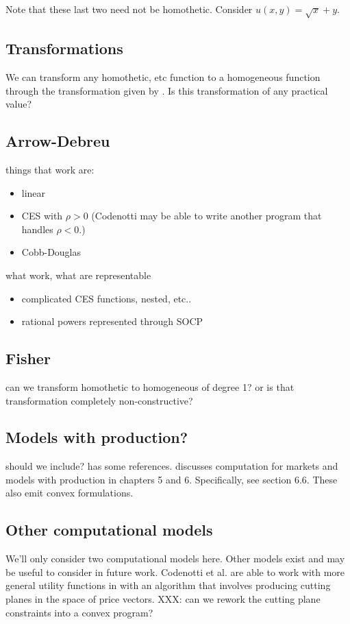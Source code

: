 \documentclass{article}
\begin{document}
Note that these last two need not be homothetic. Consider $u(x,y) = \sqrt{x} + y$.

\subsection{Transformations}
We can transform any homothetic, etc function to a homogeneous function
through the transformation given by \cite{jain2005market}.
Is this transformation of any practical value?


\subsection{Arrow-Debreu}
things that work are:
\begin{itemize}
\item linear
\item CES with $\rho > 0$ (Codenotti may be able to write another program that handles $\rho < 0$.)
\item Cobb-Douglas
\end{itemize}
what work, what are representable
\begin{itemize}
\item complicated CES functions, nested, etc..
\item rational powers represented through SOCP
\end{itemize}
\subsection{Fisher}
can we transform homothetic to homogeneous of degree 1? or is that transformation completely non-constructive?

\subsection{Models with production?}
should we include? \cite{jain2005market} has some references.
\cite{nisan2007algorithmic} discusses computation for markets and models with production in chapters 5 and 6. Specifically, see section 6.6. These also emit convex formulations.

\subsection{Other computational models}
We'll only consider two computational models here. Other models exist and may be useful to consider in future work. Codenotti et al. \cite{codenotti2005polynomial} are able to work with more general utility functions in with an algorithm that involves producing cutting planes in the space of price vectors. XXX: can we rework the cutting plane constraints into a convex program?
\end{document}
